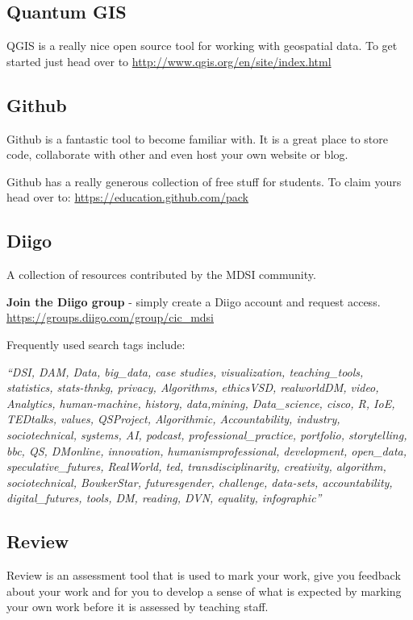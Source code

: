 \documentclass[]{book}
\theoremstyle{definition}
\theoremstyle{definition}
\theoremstyle{remark}
\begin{document}
\subsection{Quantum GIS}\label{quantum-gis}

QGIS is a really nice open source tool for working with geospatial data.
To get started just head over to
\url{http://www.qgis.org/en/site/index.html}

\subsection{Github}\label{github}

Github is a fantastic tool to become familiar with. It is a great place
to store code, collaborate with other and even host your own website or
blog.

Github has a really generous collection of free stuff for students. To
claim yours head over to: \url{https://education.github.com/pack}

\subsection{Diigo}\label{diigo}

A collection of resources contributed by the MDSI community.

\textbf{Join the Diigo group} - simply create a Diigo account and
request access. \url{https://groups.diigo.com/group/cic_mdsi}

Frequently used search tags include:

\emph{``DSI, DAM, Data, big\_data, case studies, visualization,
teaching\_tools, statistics, stats-thnkg, privacy, Algorithms,
ethicsVSD, realworldDM, video, Analytics, human-machine, history,
data,mining, Data\_science, cisco, R, IoE, TEDtalks, values, QSProject,
Algorithmic, Accountability, industry, sociotechnical, systems, AI,
podcast, professional\_practice, portfolio, storytelling, bbc, QS,
DMonline, innovation, humanismprofessional, development, open\_data,
speculative\_futures, RealWorld, ted, transdisciplinarity, creativity,
algorithm, sociotechnical, BowkerStar, futuresgender, challenge,
data-sets, accountability, digital\_futures, tools, DM, reading, DVN,
equality, infographic''}

\subsection{Review}\label{review}

Review is an assessment tool that is used to mark your work, give you
feedback about your work and for you to develop a sense of what is
expected by marking your own work before it is assessed by teaching
staff.
\end{document}
